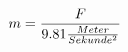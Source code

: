 \documentclass[preview]{standalone}
\begin{document}
\begin{align*}
\special{dvisvgm:raw <g id='unique000'>}m = \frac{F}{9.81 \frac{Meter}{Sekunde^{2}}}\special{dvisvgm:raw </g>}
\end{align*}
\end{document}
